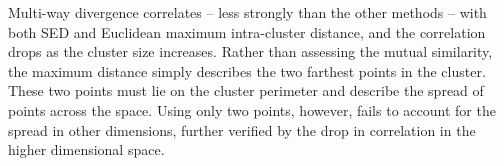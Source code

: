 Multi-way divergence correlates --  less strongly than the other methods -- with both SED and Euclidean maximum intra-cluster distance, and the correlation drops as the cluster size increases.  Rather than assessing the mutual similarity, the maximum distance simply describes the two farthest points in the cluster.  These two points must lie on the cluster perimeter and describe the spread of points across the space. Using only two points, however, fails to account for the spread in other dimensions, further verified by the drop in correlation in the higher dimensional space.

